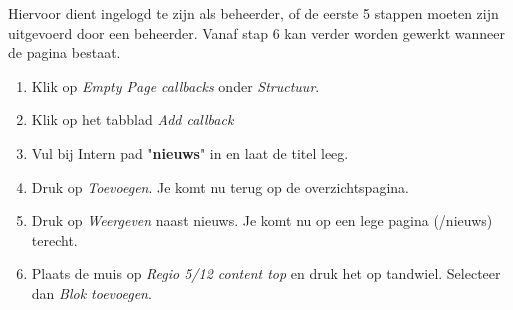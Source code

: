 Hiervoor dient ingelogd te zijn als beheerder, of de eerste 5 stappen moeten zijn uitgevoerd door een beheerder. Vanaf stap 6 kan verder worden gewerkt wanneer de pagina bestaat.

\begin{enumerate}
\item Klik op \emph{Empty Page callbacks} onder \emph{Structuur}.
\begin{center}
\end{center}
\item Klik op het tabblad \emph{Add callback}
\item Vul bij Intern pad "\textbf{nieuws}" in en laat de titel leeg.
\item Druk op \emph{Toevoegen}. Je komt nu terug op de overzichtspagina.
\item Druk op \emph{Weergeven} naast nieuws. Je komt nu op een lege pagina (/nieuws) terecht.
\begin{center}
\end{center}
\item Plaats de muis op \emph{Regio 5/12 content top} en druk het op tandwiel. Selecteer dan \emph{Blok toevoegen}.
\begin{center}

\end{center}
\end{enumerate}
